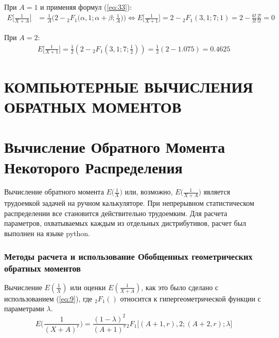 \documentclass[13pt]{article}
\begin{document}
При $A = 1$ и применяя формул (\ref{eq:33}):
\begin{align*}
    E\bigg[\frac{1}{X+A}\bigg] &= \frac{1}{A}\bigg(2 - {_{2}F_{1}}\Big(\alpha, 1; \alpha + \beta; \frac{1}{A}\Big) \bigg)
    \Longleftrightarrow E\bigg[\frac{1}{X+1}\bigg] = 2 - {_{2}F_{1}}(3,1;7;1) = 2 -  \frac{6!}{3!}\frac{2!}{5!} = 0
\end{align*}

При $A = 2$:
\begin{align*}
    E\bigg[\frac{1}{X+1}\bigg] = \frac{1}{2}(2 - {_{2}F_{1}}(3,1;7;\frac{1}{2})) = \frac{1}{2}(2 - 1.075)= 0.4625
\end{align*}


\newpage
\section*{КОМПЬЮТЕРНЫЕ ВЫЧИСЛЕНИЯ ОБРАТНЫХ МОМЕНТОВ}
\section{Вычисление Обратного Момента Некоторого Распределения}\label{section 3}
Вычисление обратного момента $E\Big(\frac{1}{X}\Big)$ или, возможно, $E\Big(\frac{1}{X+A}\Big)$ является трудоемкой задачей на ручном калькуляторе. При непрерывном статистическом распределении все становится действительно трудоемким. Для расчета параметров, охватываемых каждым из отдельных дистрибутивов, расчет был выполнен на языке python.

\subsubsection{Методы расчета и использование Обобщенных геометрических обратных моментов}
Вычисление $E(\frac{1}{X})$ или оценки $E(\frac{1}{X+A})$, как это было сделано с использованием (\ref{eq:9}), где $_{2}F_{1}()$ относится к гипергеометрической функции с параметрами $\lambda$. 
\[
E\bigg(\frac{1}{(X+A)^r}\bigg) = \frac{(1-\lambda)^2}{(A+1)^r}{}_2F_1 \Big[(A+1,r),2;(A+2,r);\lambda \Big]
\]
\end{document}
